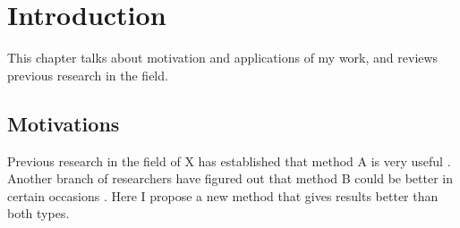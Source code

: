 \chapter{Introduction}
\label{cha:introduction}

This chapter talks about motivation and applications of my work,
and reviews previous research in the field.

\section{Motivations}
\label{sec:motivations}

Previous research in the field of X has established that method A is very useful
\cite{Fisher:1954,Robbins:1951aa,Knight:1921}.
Another branch of researchers have figured out that method B could be better in certain occasions
\cite{Wright:1921aa,Caratheodory:1909aa,Gibbs:1902,Clausius:1857}.
Here I propose a new method that gives results better than both types.

\Blindtext[1]
